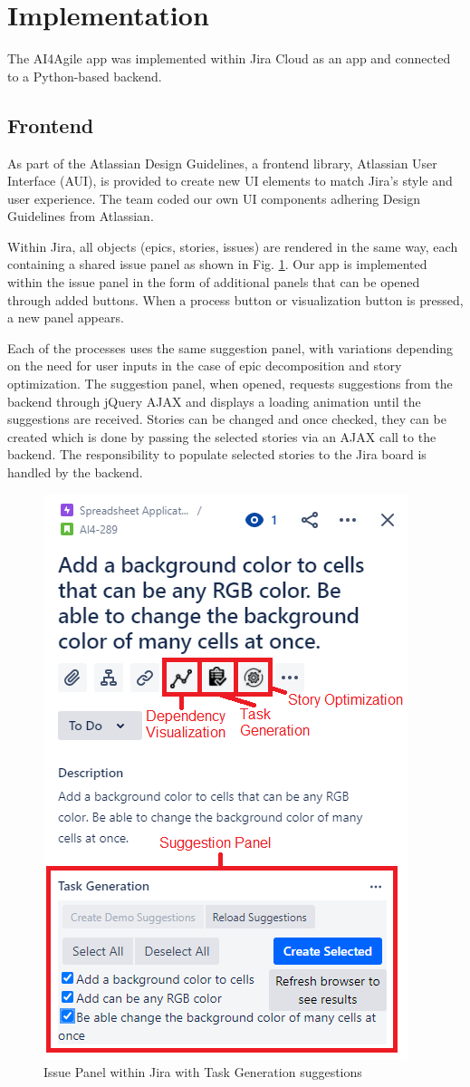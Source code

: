 \section{Implementation}
\label{implementation}

The AI4Agile app was implemented within Jira Cloud as an app and connected to a Python-based backend.

\subsection{Frontend}
As part of the Atlassian Design Guidelines\cite{jira3}, a frontend library, Atlassian User Interface (AUI)\cite{jira4}, is provided to create new UI elements to match Jira’s style and user experience. The team coded our own UI components adhering Design Guidelines from Atlassian.

Within Jira, all objects (epics, stories, issues) are rendered in the same way, each containing a shared issue panel as shown in Fig. \ref{fig:issueView}. Our app is implemented within the issue panel in the form of additional panels that can be opened through added buttons. When a process button or visualization button is pressed, a new panel appears.

Each of the processes uses the same suggestion panel, with variations depending on the need for user inputs in the case of epic decomposition and story optimization. The suggestion panel, when opened, requests suggestions from the backend through jQuery AJAX\cite{ajax} and displays a loading animation until the suggestions are received. Stories can be changed and once checked, they can be created which is done by passing the selected stories via an AJAX call to the backend. The responsibility to populate selected stories to the Jira board is handled by the backend.

\begin{figure}
\centering
\includegraphics[width=.5\textwidth,keepaspectratio]{./figure/Frontend.png}
\caption{Issue Panel within Jira with Task Generation suggestions }
\label{fig:issueView}
\end{figure}


